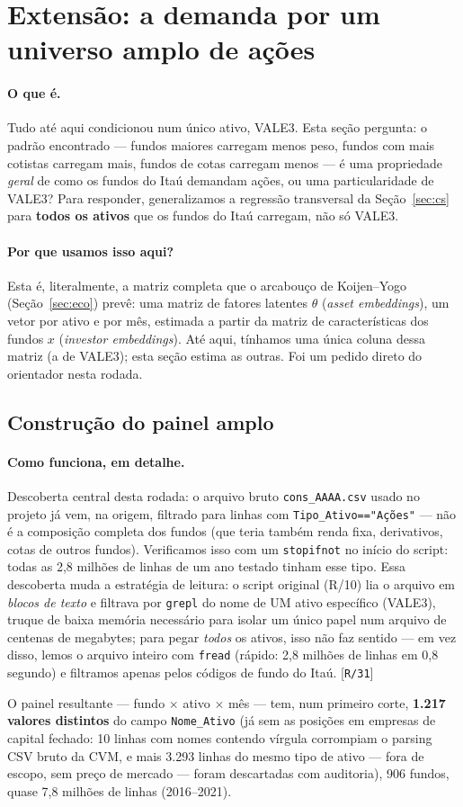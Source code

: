 \documentclass[11pt,a4paper]{article}
\newcommand{\porque}[0]{\paragraph{Por que usamos isso aqui?}}
\newcommand{\oquee}[0]{\paragraph{O que é.}}
\newcommand{\comofunciona}[0]{\paragraph{Como funciona, em detalhe.}}
\newcommand{\scriptref}[1]{{\footnotesize\color{cinza}[\texttt{#1}]}}
\begin{document}
\section{Extensão: a demanda por um universo amplo de ações}
\label{sec:multi}

\oquee Tudo até aqui condicionou num único ativo, VALE3. Esta seção pergunta: o padrão
encontrado --- fundos maiores carregam menos peso, fundos com mais cotistas carregam mais, fundos
de cotas carregam menos --- é uma propriedade \emph{geral} de como os fundos do Itaú demandam
ações, ou uma particularidade de VALE3? Para responder, generalizamos a regressão transversal da
Seção~\ref{sec:cs} para \textbf{todos os ativos} que os fundos do Itaú carregam, não só VALE3.

\porque Esta é, literalmente, a matriz completa que o arcabouço de Koijen--Yogo (Seção~\ref{sec:eco})
prevê: uma matriz de fatores latentes $\theta$ (\emph{asset embeddings}), um vetor por ativo e por
mês, estimada a partir da matriz de características dos fundos $x$ (\emph{investor embeddings}).
Até aqui, tínhamos uma única coluna dessa matriz (a de VALE3); esta seção estima as outras. Foi um
pedido direto do orientador nesta rodada.

\subsection{Construção do painel amplo}

\comofunciona Descoberta central desta rodada: o arquivo bruto \texttt{cons\_AAAA.csv} usado no
projeto já vem, na origem, filtrado para linhas com \texttt{Tipo\_Ativo=="Ações"} --- não é a
composição completa dos fundos (que teria também renda fixa, derivativos, cotas de outros
fundos). Verificamos isso com um \texttt{stopifnot} no início do script: todas as 2,8 milhões de
linhas de um ano testado tinham esse tipo. Essa descoberta muda a estratégia de leitura: o script
original (R/10) lia o arquivo em \emph{blocos de texto} e filtrava por \texttt{grepl} do nome de
UM ativo específico (VALE3), truque de baixa memória necessário para isolar um único papel num
arquivo de centenas de megabytes; para pegar \emph{todos} os ativos, isso não faz sentido --- em
vez disso, lemos o arquivo inteiro com \texttt{fread} (rápido: 2,8 milhões de linhas em 0,8
segundo) e filtramos apenas pelos códigos de fundo do Itaú. \scriptref{R/31}

O painel resultante --- fundo $\times$ ativo $\times$ mês --- tem, num primeiro corte,
\textbf{1.217 valores distintos} do campo \texttt{Nome\_Ativo} (já sem as posições em empresas de
capital fechado: 10 linhas com nomes contendo vírgula corrompiam o parsing CSV bruto da CVM, e
mais 3.293 linhas do mesmo tipo de ativo --- fora de escopo, sem preço de mercado --- foram
descartadas com auditoria), 906 fundos, quase 7,8 milhões de linhas (2016--2021).
\end{document}
